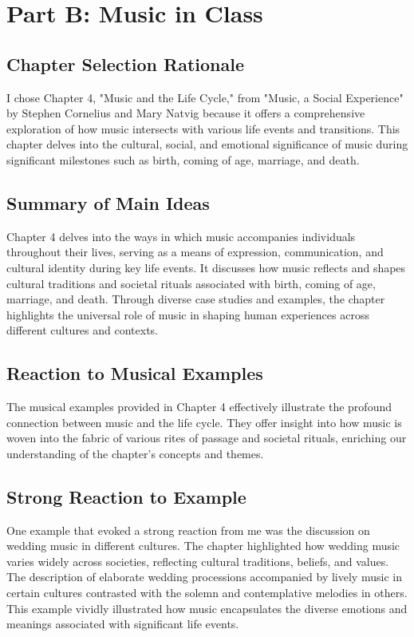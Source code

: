 
\section{Part B: Music in Class}

\subsection{Chapter Selection Rationale}

I chose Chapter 4, "Music and the Life Cycle," from "Music, a Social Experience" by Stephen Cornelius and Mary Natvig\autocite{cornelius_natvig} because it offers a comprehensive exploration of how music intersects with various life events and transitions. This chapter delves into the cultural, social, and emotional significance of music during significant milestones such as birth, coming of age, marriage, and death.

\subsection{Summary of Main Ideas}

Chapter 4 delves into the ways in which music accompanies individuals throughout their lives, serving as a means of expression, communication, and cultural identity during key life events. It discusses how music reflects and shapes cultural traditions and societal rituals associated with birth, coming of age, marriage, and death. Through diverse case studies and examples, the chapter highlights the universal role of music in shaping human experiences across different cultures and contexts.

\subsection{Reaction to Musical Examples}

The musical examples provided in Chapter 4 effectively illustrate the profound connection between music and the life cycle. They offer insight into how music is woven into the fabric of various rites of passage and societal rituals, enriching our understanding of the chapter's concepts and themes.

\subsection{Strong Reaction to Example}

One example that evoked a strong reaction from me was the discussion on wedding music in different cultures. The chapter highlighted how wedding music varies widely across societies, reflecting cultural traditions, beliefs, and values. The description of elaborate wedding processions accompanied by lively music in certain cultures contrasted with the solemn and contemplative melodies in others. This example vividly illustrated how music encapsulates the diverse emotions and meanings associated with significant life events.

